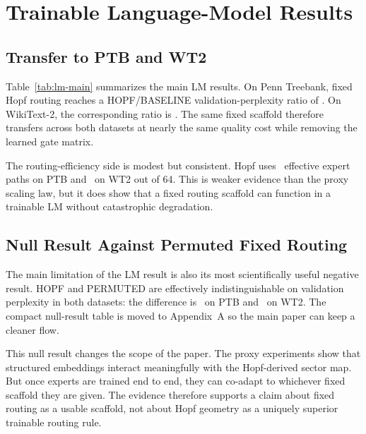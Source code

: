 \documentclass[10pt,twocolumn]{article}
\begin{document}
\section{Trainable Language-Model Results}
\subsection{Transfer to PTB and WT2}
Table~\ref{tab:lm-main} summarizes the main LM results. On Penn Treebank, fixed Hopf routing reaches a HOPF/BASELINE validation-perplexity ratio of \PaperPTBHopfBaselineRatio. On WikiText-2, the corresponding ratio is \PaperWTTwoHopfBaselineRatio. The same fixed scaffold therefore transfers across both datasets at nearly the same quality cost while removing the learned gate matrix.

\begin{table}[t]
  \centering
  \caption{Toy language-model transfer results generated from canonical CSV exports. Fixed Hopf routing remains within about $8\%$ of the learned top-1 baseline on both datasets while removing the learned gate matrix, but it does not outperform the permuted fixed-routing null.}
  \label{tab:lm-main}
  \small
  \resizebox{\columnwidth}{!}{}
\end{table}

The routing-efficiency side is modest but consistent. Hopf uses \PaperPTBHopfEff\ effective expert paths on PTB and \PaperWTTwoHopfEff\ on WT2 out of 64. This is weaker evidence than the proxy scaling law, but it does show that a fixed routing scaffold can function in a trainable LM without catastrophic degradation.

\subsection{Null Result Against Permuted Fixed Routing}
\label{sec:null}
The main limitation of the LM result is also its most scientifically useful negative result. HOPF and PERMUTED are effectively indistinguishable on validation perplexity in both datasets: the difference is \PaperPTBHopfPermDelta\ on PTB and \PaperWTTwoHopfPermDelta\ on WT2. The compact null-result table is moved to Appendix~A so the main paper can keep a cleaner flow.

This null result changes the scope of the paper. The proxy experiments show that structured embeddings interact meaningfully with the Hopf-derived sector map. But once experts are trained end to end, they can co-adapt to whichever fixed scaffold they are given. The evidence therefore supports a claim about fixed routing as a usable scaffold, not about Hopf geometry as a uniquely superior trainable routing rule.
\end{document}
